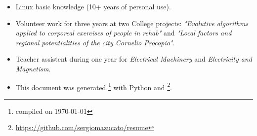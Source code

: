\documentclass[]{friggeri-cv}
\begin{document}
\begin{itemize}
	\item Linux basic knowledge (10+ years of personal use).
	\item Volunteer work for three years at two College projects: \textit{"Evolutive algorithms applied to corporeal exercises of people in rehab"} and \textit{"Local factors and regional potentialities of the city Cornelio Procopio"}.
	\item Teacher assistent during one year for \textit{Electrical Machinery} and \textit{Electricity and Magnetism}.
	\item This document was generated \footnote{compiled on \today} with Python and \myfont{\LaTeX} \footnote{\url{https://github.com/sergiomazucato/resume}}.\\
\end{itemize}

\end{document}
